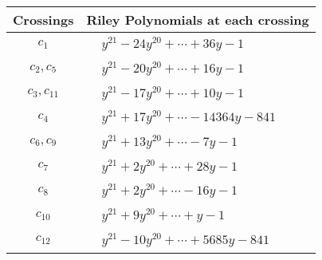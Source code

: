 \documentclass[1p]{elsarticle_modified}
\theoremstyle{definition}
\begin{document}
\begin{tabular}{m{50pt}|m{274pt}}
Crossings & \hspace{64pt}Riley Polynomials at each crossing \\
\hline $$\begin{aligned}c_{1}\end{aligned}$$&$\begin{aligned}
&y^{21}-24 y^{20}+\cdots+36 y-1
\end{aligned}$\\
\hline $$\begin{aligned}c_{2},c_{5}\end{aligned}$$&$\begin{aligned}
&y^{21}-20 y^{20}+\cdots+16 y-1
\end{aligned}$\\
\hline $$\begin{aligned}c_{3},c_{11}\end{aligned}$$&$\begin{aligned}
&y^{21}-17 y^{20}+\cdots+10 y-1
\end{aligned}$\\
\hline $$\begin{aligned}c_{4}\end{aligned}$$&$\begin{aligned}
&y^{21}+17 y^{20}+\cdots-14364 y-841
\end{aligned}$\\
\hline $$\begin{aligned}c_{6},c_{9}\end{aligned}$$&$\begin{aligned}
&y^{21}+13 y^{20}+\cdots-7 y-1
\end{aligned}$\\
\hline $$\begin{aligned}c_{7}\end{aligned}$$&$\begin{aligned}
&y^{21}+2 y^{20}+\cdots+28 y-1
\end{aligned}$\\
\hline $$\begin{aligned}c_{8}\end{aligned}$$&$\begin{aligned}
&y^{21}+2 y^{20}+\cdots-16 y-1
\end{aligned}$\\
\hline $$\begin{aligned}c_{10}\end{aligned}$$&$\begin{aligned}
&y^{21}+9 y^{20}+\cdots+y-1
\end{aligned}$\\
\hline $$\begin{aligned}c_{12}\end{aligned}$$&$\begin{aligned}
&y^{21}-10 y^{20}+\cdots+5685 y-841
\end{aligned}$\\
\hline
\end{tabular}\\~\\
\end{document}

